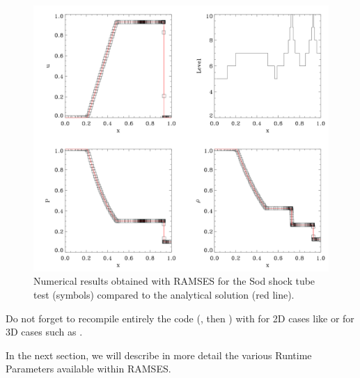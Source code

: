 \begin{figure}
   \includegraphics[width=\textwidth]{img/sod.png}
   \caption{Numerical results obtained with RAMSES for the Sod shock
tube test (symbols) compared to the analytical solution (red line).}
   \label{fig:sod1d}
\end{figure}


\begin{warning}
   Do not forget to recompile entirely the code (, then
) with  for 2D cases like  or
 for 3D cases such as .
\end{warning}

In the next section, we will describe in more detail the various
Runtime Parameters available within RAMSES.

